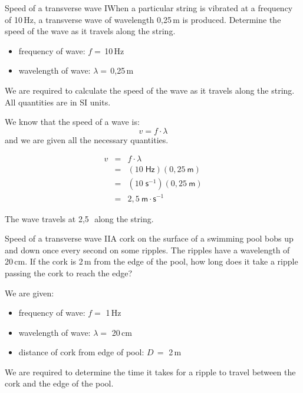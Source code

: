\begin{definition}

\begin{wex}{Speed of a transverse wave I}{When a particular string is vibrated at a frequency of 10\,Hz, a transverse wave of wavelength 0,25\,m is produced. Determine the speed of the wave as it travels along the string.}
{
\begin{itemize}
\item{frequency of wave: $f=$\,10\,Hz}
\item{wavelength of wave: $\lambda=$\,0,25\,m}
\end{itemize}
We are required to calculate the speed of the wave as it travels along the string. All quantities are in SI units.

We know that the speed of a wave is:
\begin{equation*}
v=f\cdot \lambda 
\end{equation*}
and we are given all the necessary quantities.

\begin{eqnarray*}
v&=&f\cdot \lambda\\
&=&(10\;\mathsf{Hz})(0,25~\mathsf{m})\\
&=&(10\;\mathsf{s}^{-1})(0,25~\mathsf{m})\\
&=&2,5~\mathsf{m\cdot s}^{-1}
\end{eqnarray*}

The wave travels at 2,5\,\ms\ along the string.
}
\end{wex}


\begin{wex}{Speed of a transverse wave II}{A cork on the surface of a swimming pool bobs up and down once every second on some ripples. The ripples have a wavelength of 20\,cm. If the cork is 2\,m from the edge of the pool, how long does it take a ripple passing the cork to reach the edge?}{
We are given:
\begin{itemize}
\item{frequency of wave: $f =$ 1\,Hz}
\item{wavelength of wave: $\lambda =$ 20\,cm}
\item{distance of cork from edge of pool: $D\,=$ 2\,m}
\end{itemize}
We are required to determine the time it takes for a ripple to travel between the cork and the edge of the pool.

}
\end{wex}
\end{definition}
